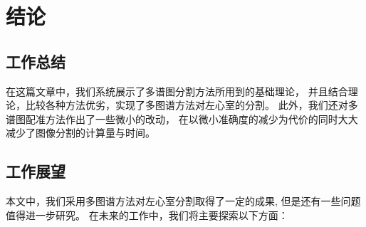 
\chapter{结论}
\section{工作总结}
在这篇文章中，我们系统展示了多谱图分割方法所用到的基础理论，
并且结合理论，比较各种方法优劣，实现了多图谱方法对左心室的分割。
此外，我们还对多谱图配准方法作出了一些微小的改动，
在以微小准确度的减少为代价的同时大大减少了图像分割的计算量与时间。

\section{工作展望}
本文中，我们采用多图谱方法对左心室分割取得了一定的成果,
但是还有一些问题值得进一步研究。
在未来的工作中，我们将主要探索以下方面：
